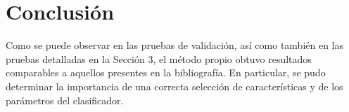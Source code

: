 \documentclass[12pt,bibliography=oldstyle,DIV=12,parskip=half-]{scrreprt}
\begin{document}


%
%
%
%


%
%

%
%
%
%
%
%
%
%
%
%
%
%
%
%
%
%
%
%
%
%
%
%
%
%
%
%
%
%
%
%
\chapter{Conclusión}
%
Como se puede observar en las pruebas de validación,
así como también en las pruebas detalladas en la Sección 3,
el método propio obtuvo resultados comparables
a aquellos presentes en la bibliografía.
En particular, se pudo determinar la importancia de una correcta
selección de características y de los parámetros del clasificador.
%
%
%
%
%
%
%
%
\renewcommand{\bibfont}{\normalfont\footnotesize}
\printbibliography
\end{document}

